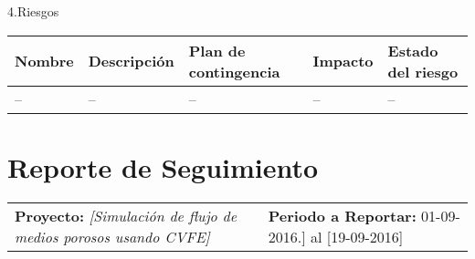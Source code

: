 \documentclass[12pt]{report}
\numberwithin{equation}{section}
\begin{document}
\begin{flushleft}
\large{4.Riesgos}\\


\begin{table}[H]
\begin{tabular}{|m{2cm}|m{4cm}|m{4.5cm}|m{1.5cm}|m{2cm}|}
\hline 
\textbf{Nombre } & \textbf{Descripci\'on} & \textbf{Plan de contingencia} & \textbf{Impacto} & \textbf{Estado del riesgo}  \\
\hline
\hline
\small{--} & \small{--}& \small{--}  & \small{--} & \small{--}\\
\hline
\end{tabular}
\label{tabla: TABLA CE de nuevos riesgos}
\end{table}

\end{flushleft}

\newpage

\centering \section{Reporte de Seguimiento} 


\begin{tabular}{m{7cm} m{8cm}}
\small{ \textbf{Proyecto:} \scriptsize{\textit{[Simulaci\'on de flujo de medios porosos usando CVFE]}}} & \small{\textbf{Periodo a Reportar:} \scriptsize{01-09-2016.] al [19-09-2016]}}
\end{tabular}
\end{document}

